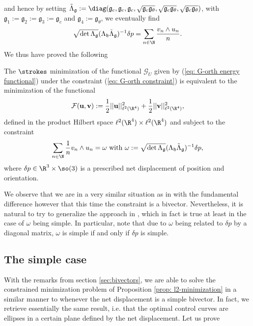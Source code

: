 and hence by setting $\tilde{\Lambda}_{\mathfrak{g}} := \diag(\mathfrak{g}_c, \mathfrak{g}_c, \mathfrak{g}_c, \sqrt{\mathfrak{g}_c \mathfrak{g}_{\theta}}, \sqrt{\mathfrak{g}_c \mathfrak{g}_{\theta}}, \sqrt{\mathfrak{g}_c  \mathfrak{g}_{\theta}})$, with $\mathfrak{g}_1 :=\mathfrak{g}_2 := \mathfrak{g}_3 := \mathfrak{g}_c$ and $\mathfrak{g}_4 := \mathfrak{g}_\theta$, we eventually find
\begin{equation}
\label{eq:relation between net displacement and Fourier modes}
\sqrt{\det \Lambda_{\mathfrak{g}}} (\Lambda_{\mathfrak{h}} \tilde{\Lambda}_{\mathfrak{g}})^{-1} \delta p = \sum_{n \in \N} \frac{v_n  \wedge u_n}{n}.
\end{equation}
We thus have proved the following

\begin{proposition}
\label{prop: l2-minimization}
The $\strokes$ minimization of the functional $\mathcal{G}_U$ given by (\ref{eq: G-orth energy functional}) under the constraint (\ref{eq: G-orth constraint}) is equivalent to the minimization of the functional
\begin{equation}
\label{eq:l2-energy}
	\mathcal{F}(\mathbf{u}, \mathbf{v}) := \frac{1}{2} ||\mathbf{u} ||^2_{\ell^2(\R^4)} + \frac{1}{2} ||\mathbf{v}||^2_{\ell^2(\R^4)},
\end{equation}
defined in the product Hilbert space $\ell^2(\R^4) \times \ell^2(\R^4)$ and subject to the constraint
\begin{equation}
\label{eq:l2-constraint}
\sum_{n \in \N} \frac{1}{n} v_n \wedge u_n = \omega \text{ with } \omega := \sqrt{\det \Lambda_{\mathfrak{g}}}(\Lambda_{\mathfrak{h}} \tilde{\Lambda}_{\mathfrak{g}})^{-1} \delta p,
\end{equation}
where $\delta p \in \R^3 \times \so(3)$ is a prescribed net displacement of position and orientation.
\end{proposition}

We observe that we are in a very similar situation as in \cite{Alouges2017} with the fundamental difference however that this time the constraint is a bivector. Nevertheless, it is natural to try to generalize the approach in \cite{Alouges2017}, which in fact is true at least in the case of $\omega$ being simple. In particular, note that due to $\omega$ being related to $\delta p$ by a diagonal matrix, $\omega$ is simple if and only if $\delta p$ is simple.

\subsection[The simple case]{The simple case}
With the remarks from section \ref{sec:bivectors}, we are able to solve the constrained minimization problem of Proposition \ref{prop: l2-minimization} in a similar manner to \cite{Alouges2017} whenever the net displacement is a simple bivector. In fact, we retrieve essentially the same result, i.e. that the optimal control curves are ellipses in a certain plane defined by the net displacement. Let us prove

